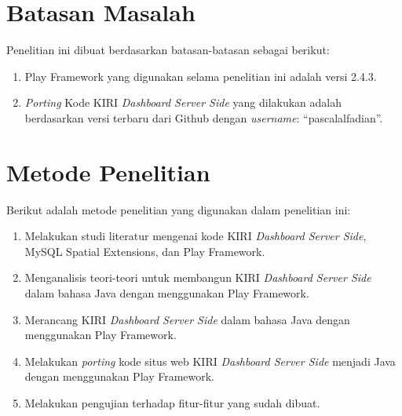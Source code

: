 \section{Batasan Masalah}
\label{sec:batasan_masalah}
Penelitian ini dibuat berdasarkan batasan-batasan sebagai berikut:
	\begin{enumerate}
		\item Play Framework yang digunakan selama penelitian ini adalah versi 2.4.3.
		\item \textit{Porting} Kode KIRI \textit{Dashboard Server Side} yang dilakukan adalah berdasarkan versi terbaru dari Github dengan \textit{username}: ``pascalalfadian''\cite{kiridashboard}.
	\end{enumerate}
	
\section{Metode Penelitian}
\label{sec:metode_penelitian}
Berikut adalah metode penelitian yang digunakan dalam penelitian ini:
	\begin{enumerate}
		\item Melakukan studi literatur mengenai kode KIRI \textit{Dashboard Server Side}, MySQL Spatial Extensions, dan Play Framework.
		\item Menganalisis teori-teori untuk membangun KIRI \textit{Dashboard Server Side} dalam bahasa Java dengan menggunakan Play Framework.
		\item Merancang KIRI \textit{Dashboard Server Side} dalam bahasa Java dengan menggunakan Play Framework.
		\item Melakukan \textit{porting} kode situs web KIRI \textit{Dashboard Server Side} menjadi Java dengan menggunakan Play Framework.
		\item Melakukan pengujian terhadap fitur-fitur yang sudah dibuat.
	\end{enumerate}

